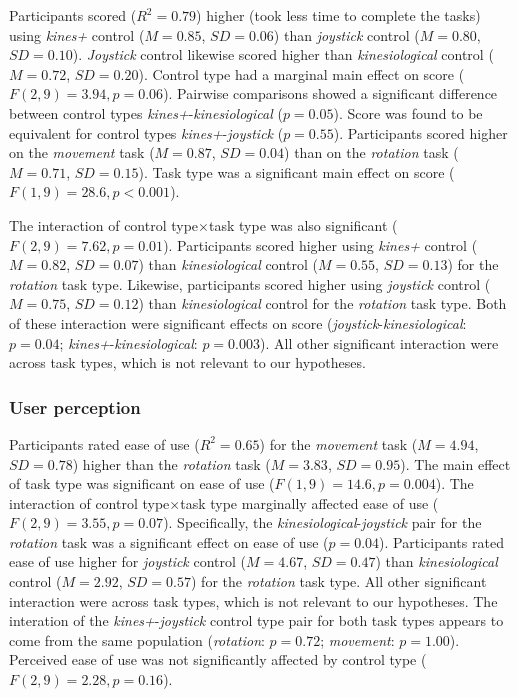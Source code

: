 \documentclass{sigchi}
\begin{document}
Participants scored ($R^{2}=0.79$) higher (took less time to complete the tasks) using \textit{kines+} control ($M=0.85$, $SD=0.06$) than \textit{joystick} control ($M=0.80$, $SD=0.10$). \textit{Joystick} control likewise scored higher than \textit{kinesiological} control ($M=0.72$, $SD=0.20$). Control type had a marginal main effect on score ($F(2, 9)=3.94, p=0.06$). Pairwise comparisons showed a significant difference between control types \textit{kines+}-\textit{kinesiological} ($p=0.05$). Score was found to be equivalent for control types \textit{kines+}-\textit{joystick} ($p=0.55$). Participants scored higher on the \textit{movement} task ($M=0.87$, $SD=0.04$) than on the \textit{rotation} task ($M=0.71$, $SD=0.15$). Task type was a significant main effect on score ($F(1, 9)=28.6, p<0.001$).

The interaction of control type$\times$task type was also significant ($F(2, 9)=7.62, p=0.01$). Participants scored higher using \textit{kines+} control ($M=0.82$, $SD=0.07$) than \textit{kinesiological} control ($M=0.55$, $SD=0.13$) for the \textit{rotation} task type. Likewise,  participants scored higher using \textit{joystick} control ($M=0.75$, $SD=0.12$) than \textit{kinesiological} control for the \textit{rotation} task type. Both of these interaction were significant effects on score (\textit{joystick}-\textit{kinesiological}: $p=0.04$; \textit{kines+}-\textit{kinesiological}: $p=0.003$). All other significant interaction were across task types, which is not relevant to our hypotheses.

\subsubsection{User perception}

Participants rated ease of use ($R^{2}=0.65$) for the \textit{movement} task ($M=4.94$, $SD=0.78$) higher than the \textit{rotation} task ($M=3.83$, $SD=0.95$). The main effect of task type was significant on ease of use ($F(1, 9)=14.6, p=0.004$). The interaction of control type$\times$task type marginally affected ease of use ($F(2, 9)=3.55, p=0.07$). Specifically, the \textit{kinesiological}-\textit{joystick} pair for the \textit{rotation} task was a significant effect on ease of use ($p=0.04$). Participants rated ease of use higher for \textit{joystick} control ($M=4.67$, $SD=0.47$) than \textit{kinesiological} control ($M=2.92$, $SD=0.57$) for the \textit{rotation} task type. All other significant interaction were across task types, which is not relevant to our hypotheses. The interation of the \textit{kines+}-\textit{joystick} control type pair for both task types appears to come from the same population (\textit{rotation}: $p=0.72$; \textit{movement}: $p=1.00$). Perceived ease of use was not significantly affected by control type ($F(2, 9)=2.28, p=0.16$).
\end{document}
